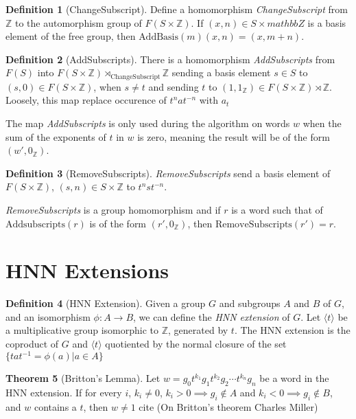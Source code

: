 \documentclass[11pt]{article} %
\theoremstyle{definition}
\newtheorem{theorem}{Theorem}[section]
\theoremstyle{definition}
\theoremstyle{definition}
\theoremstyle{definition}
\theoremstyle{definition}
\newtheorem{defn}[theorem]{Definition}
\theoremstyle{definition}
\begin{document}
\begin{defn}[ChangeSubscript]\label{changesubscript}
  Define a homomorphism \textit{ChangeSubscript} from $\mathbb{Z}$ to the automorphism
  group of $F(S \times \mathbb{Z})$. If $(x, n) \in S \times mathbb{Z}$ is a basis
  element of the free group, then $\text{AddBasis}(m)(x, n) = (x, m + n)$.
\end{defn}

\begin{defn}[AddSubscripts]\label{AddSubscripts}
  There is a homomorphism \textit{AddSubscripts} from $F(S)$ into $F(S \times \mathbb{Z})
  \rtimes_{\text{ChangeSubscript}} \mathbb{Z}$ sending a basis element $s \in S$ to
  $(s, 0) \in F(S \times \mathbb{Z})$, when $s \ne t$ and sending $t$ to
  $(1, 1_\mathbb{Z}) \in F(S \times \mathbb{Z}) \rtimes \mathbb{Z}$. Loosely, this map
  replace occurence of $t^n at^{-n}$ with $a_t$
\end{defn}

The map \textit{AddSubscripts} is only used during the algorithm on words $w$ when the sum of the
exponents of $t$ in $w$ is zero, meaning the result will be of the form $(w', 0_{\mathbb{Z}})$.

\begin{defn}[RemoveSubscripts]
  \textit{RemoveSubscripts} send a basis element of $F(S\times \mathbb{Z})$,  $(s, n) \in S\times \mathbb{Z}$
  to $t^n s t^{-n}$.
\end{defn}
\textit{RemoveSubscripts} is a group homomorphism and if $r$ is a word such that
of $\text{Addsubscripts}(r)$ is of the form $(r', 0_\mathbb{Z})$, then $\text{RemoveSubscripts}(r')=r$.

\section{HNN Extensions}\label{HNN}

\begin{defn}[HNN Extension]
  Given a group $G$ and subgroups $A$ and $B$ of $G$, and an isomorphism $\phi : A \to B$, we can define
  the \textit{HNN extension} of $G$. Let $\langle t \rangle$ be a multiplicative group isomorphic to
  $\mathbb{Z}$, generated by $t$. The HNN extension is the coproduct of $G$ and $\langle t \rangle$ quotiented
  by the normal closure of the set $\{ta t^{-1} = \phi(a) | a \in A\}$
\end{defn}

\begin{theorem}[Britton's Lemma]\label{britton}
  Let $w = g_0t^{k_1}g_1t^{k_2}g_2 \cdots t^{k_n}g_n$ be a word in the HNN extension.
  If for every $i$, $k_i \ne 0$, $k_i > 0 \implies g_i \notin A$ and $k_i < 0 \implies g_i \notin B$,
  and $w$ contains a $t$, then $w \ne 1$
  cite (On Britton's theorem Charles Miller)
\end{theorem}
\end{document}
